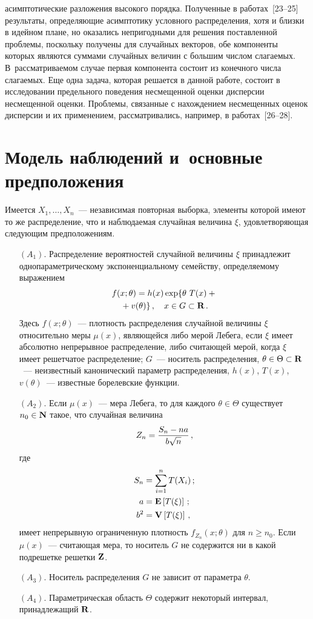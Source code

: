 \begin{multicols}{2}
  асимптотические разложения высокого порядка.
   Полученные в работах~[23--25] результаты, определяющие асимптотику условного
  распределения, хотя и близки
  в идейном плане, но оказались непригодными для решения поставленной
  проблемы, поскольку получены для случайных векторов, обе компоненты
  которых являются суммами случайных величин с большим числом слагаемых.
  В~рассматриваемом случае первая компонента состоит из конечного
  числа слагаемых.
    Еще одна задача, которая решается в
  данной работе, состоит в исследовании предельного поведения
  несмещенной оценки дисперсии несмещенной оценки.
   Проблемы, связанные с нахождением несмещенных оценок дисперсии и их
   применением, рас\-смат\-ри\-ва\-лись, например, в работах~[26--28].

  \section{Модель наблюдений и~основные предположения}

   Имеется $X_1,\ldots,X_n$~--- независимая повторная выборка,
  элементы которой имеют то же распределение, что и наблюдаемая
  случайная величина $\xi$, удовлетворяющая следующим предположениям.
{\addtolength{\leftmargini}{10pt}
  \begin{itemize}
  \item[$(A_1).$]
 Распределение вероятностей случайной величины $\xi$ принадлежит
 однопараметрическому экспоненциальному  семейству, определяемому
 выражением
\begin{multline}
f(x;\theta)=h(x) \exp\{\theta~T(x)+{}\\
{}+v(\theta)\}\,,
\quad x\in G\subset \mbox {\bf R}\,.
\label{e1c}
 \end{multline}
  Здесь $f(x;\theta)$~--- плотность распределения случайной величины $\xi$
 относительно меры $\mu(x)$, являющейся либо мерой Лебега, если $\xi$
 имеет абсолютно непрерывное распределение,\linebreak
 либо считающей мерой,
 когда $\xi$ имеет решетчатое распределение;
 $G$~--- носитель распределения, $\theta\in \Theta\subset\mbox {\bf R}$~--- неизвестный
 канонический параметр распределения,
 $h(x)$, $T(x)$, $v(\theta)$~--- известные борелевские функции.
  \item[\sffamily $(A_2).$]
 Если $\mu(x)$~--- мера Лебега, то для каждого $\theta\in \Theta$ существует
 $n_0\in {\bf N}$ такое, что случайная величина
  $$
Z_n=\displaystyle\frac{\displaystyle S_n-n a\mathstrut}{\displaystyle b\sqrt{n}\mathstrut}\,,
$$
где
\begin{align*}
S_n&=\sum^n_{i=1}T(X_i)\,;\\
a&=\mbox {\bf E}\left[ T(\xi)\right]\,;\\
b^2&=\mbox {\bf V}\left[ T(\xi)\right]\,,
\end{align*}
 имеет непрерывную ограниченную плотность $f_{Z_n}(x;\theta)$
 для $n\ge n_0$. Если $\mu(x)$~--- считающая мера, то носитель $G$
 не содержится ни в какой подрешетке решетки $\bf Z$.
  \item[\sffamily $(A_3).$]
 Носитель распределения $G$ не зависит от параметра $\theta$.
  \item[\sffamily $(A_4).$]
 Параметрическая область $\Theta$ содержит некоторый интервал,
 принадлежащий $\bf R$.
\end{itemize}
}


\end{multicols}
